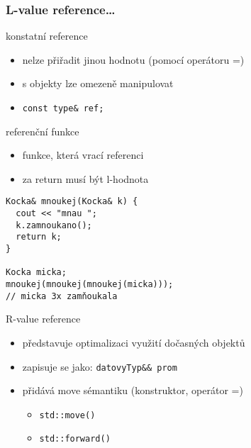 \begin{frame}[fragile]
\frametitle{L-value reference\ldots}

\begin{bitemize}
\item konstatní reference
\begin{itemize}
\item nelze přiřadit jinou hodnotu (pomocí operátoru =)
\item s objekty lze omezeně manipulovat
\item \lstinline|const type& ref;|
\end{itemize}
\item referenční funkce
\begin{itemize}
\item funkce, která vrací referenci
\item za return musí být l-hodnota
\end{itemize}
\end{bitemize}

\begin{yesblock}
\begin{lstlisting}[basicstyle=\scriptsize]
Kocka& mnoukej(Kocka& k) {
  cout << "mnau ";
  k.zamnoukano();
  return k;
}

Kocka micka;
mnoukej(mnoukej(mnoukej(micka)));
// micka 3x zamňoukala

\end{lstlisting}
\end{yesblock}
\end{frame}


\begin{frame}[fragile]

\begin{bonusblock}{R-value reference}
\begin{itemize}
\item představuje optimalizaci využití dočasných objektů
\item zapisuje se jako: \lstinline|datovyTyp&& prom|
\item přidává move sémantiku (konstruktor, operátor =)
\begin{itemize}
\item \lstinline|std::move()|
\item \lstinline|std::forward()|
\end{itemize}
\end{itemize}
\end{bonusblock}
\end{frame}


